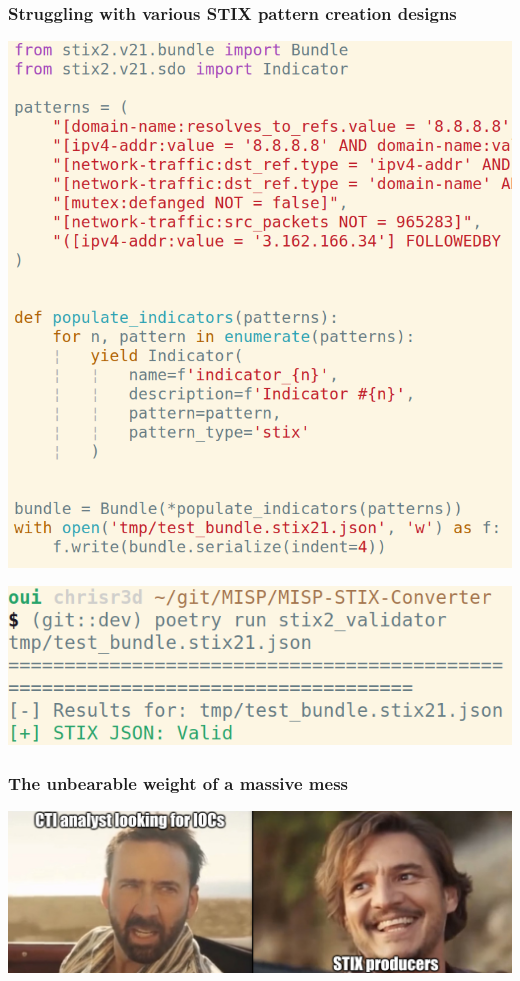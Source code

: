 \begin{frame}
    \frametitle{Struggling with various STIX pattern creation designs}
    \begin{minipage}{0.5\textwidth}
        \centering
        \includegraphics[scale=0.25]{images/generate_indicators.png}
    \end{minipage}%
    \begin{minipage}{0.5\textwidth}
        \includegraphics[scale=0.3]{images/stix2_validator.png}
    \end{minipage}
\end{frame}

\begin{frame}
    \frametitle{The unbearable weight of a massive mess}
    \includegraphics[scale=0.28]{images/nicolas_and_pedro.png}
\end{frame}

